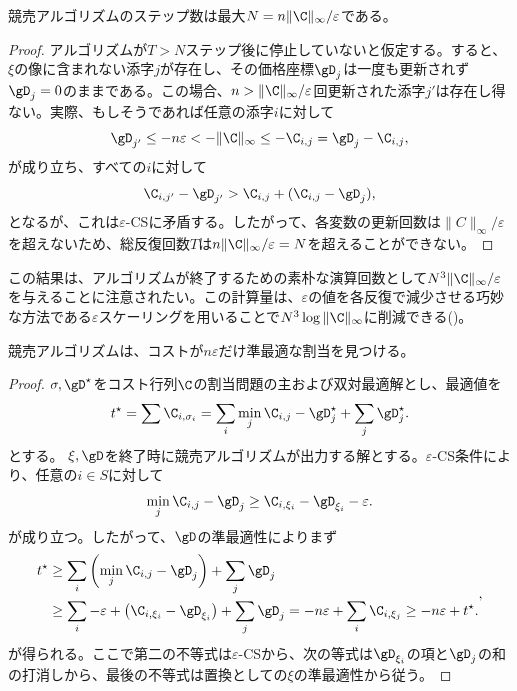 \begin{prop} 競売アルゴリズムのステップ数は最大$N=n\|\C\|_\infty/\varepsilon$である。
\end{prop}
\begin{proof}アルゴリズムが$T>N$ステップ後に停止していないと仮定する。すると、$\xi$の像に含まれない添字$j$が存在し、その価格座標$\gD_j$は一度も更新されず$\gD_j=0$のままである。この場合、$n>\|\C\|_\infty/\varepsilon$回更新された添字$j'$は存在し得ない。実際、もしそうであれば任意の添字$i$に対して
$$\gD_{j'}\leq-n\varepsilon<-\|\C\|_\infty\leq -\C_{i,j} = \gD_j-\C_{i,j},$$
が成り立ち、すべての$i$に対して
$$\C_{i,j'}-\gD_{j'}> \C_{i,j}+ (\C_{i,j}-\gD_j),$$
となるが、これは$\varepsilon$-CSに矛盾する。したがって、各変数の更新回数は$\|C\|_\infty/\varepsilon$を超えないため、総反復回数$T$は$n\|\C\|_\infty/\varepsilon=N$を超えることができない。
\end{proof}

\begin{rem} この結果は、アルゴリズムが終了するための素朴な演算回数として$N^3\|\C\|_\infty/\varepsilon$を与えることに注意されたい。この計算量は、$\varepsilon$の値を各反復で減少させる巧妙な方法である$\varepsilon$スケーリングを用いることで$N^3 \log\|\C\|_\infty$に削減できる(\cite[p. 264]{bertsekas1998network})。
\end{rem}

\begin{prop} 競売アルゴリズムは、コストが$n\varepsilon$だけ準最適な割当を見つける。
\end{prop}
\begin{proof}
	$\sigma,\gD^\star$をコスト行列$\C$の割当問題の主および双対最適解とし、最適値を$$t^\star=\sum \C_{i,\sigma_i} = \sum_i \min_{j}\C_{i,j}-\gD^\star_j+\sum_j\gD^\star_j.$$とする。
$\xi,\gD$を終了時に競売アルゴリズムが出力する解とする。$\varepsilon$-CS条件により、任意の$i\in S$に対して
$$\min_{j} \C_{i,j} - \gD_{j}\geq \C_{i,\xi_i} - \gD_{\xi_i} -\varepsilon.$$
が成り立つ。したがって、$\gD$の準最適性によりまず
	$$\begin{aligned}t^\star&\geq \sum_i \left(\min_{j} \C_{i,j}-\gD_{j}\right) + \sum_j \gD_j\\
&\geq
	\sum_i -\varepsilon+\left(\C_{i,\xi_i}-\gD_{\xi_i}\right) + \sum_j \gD_j = -n\varepsilon + \sum_i \C_{i,\xi_j} \geq  - n\varepsilon + t^\star.\end{aligned},$$
が得られる。ここで第二の不等式は$\varepsilon$-CSから、次の等式は$\gD_{\xi_i}$の項と$\gD_{j}$の和の打消しから、最後の不等式は置換としての$\xi$の準最適性から従う。
\end{proof}


